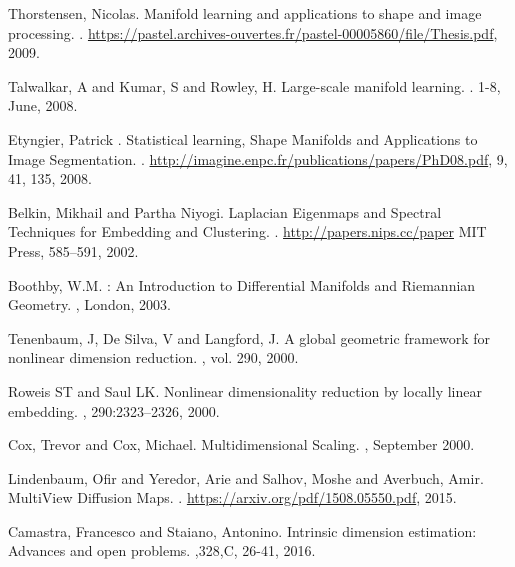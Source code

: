 \begin{thebibliography}{99}
\setlength{\parskip}{1em}

 Thorstensen, Nicolas. 
\newblock Manifold learning and applications to shape and image processing.
.
\newblock \url {https://pastel.archives-ouvertes.fr/pastel-00005860/file/Thesis.pdf}, 2009.


 Talwalkar, A and Kumar, S and Rowley, H. 
\newblock Large-scale manifold learning.
. 1-8, June, 2008.


 Etyngier, Patrick . 
\newblock Statistical learning, Shape Manifolds and Applications to Image Segmentation.
.
\newblock \url {http://imagine.enpc.fr/publications/papers/PhD08.pdf}, 9, 41, 135, 2008.

 Belkin, Mikhail and Partha Niyogi. 
\newblock Laplacian Eigenmaps and Spectral Techniques for Embedding and Clustering.
.
\newblock \url {http://papers.nips.cc/paper} MIT Press, 585--591, 2002.

 Boothby, W.M.
\newblock: An Introduction to Differential Manifolds and Riemannian Geometry. 
, London, 2003.


 Tenenbaum, J,  De Silva, V and Langford, J. 
\newblock A global geometric framework for nonlinear dimension reduction.
, vol. 290, 2000.

 Roweis ST and Saul LK.
\newblock  Nonlinear dimensionality reduction by locally linear embedding.
, 290:2323–2326, 2000.

 Cox, Trevor and Cox, Michael.
\newblock Multidimensional Scaling.
, September 2000.

 Lindenbaum, Ofir and Yeredor, Arie and Salhov, Moshe and Averbuch, Amir.
\newblock MultiView Diffusion Maps.
.
\newblock \url {https://arxiv.org/pdf/1508.05550.pdf}, 2015.

 Camastra, Francesco and Staiano, Antonino.
\newblock  Intrinsic dimension estimation: Advances and open problems.
,328,C, 26-41, 2016.


\end{thebibliography}
